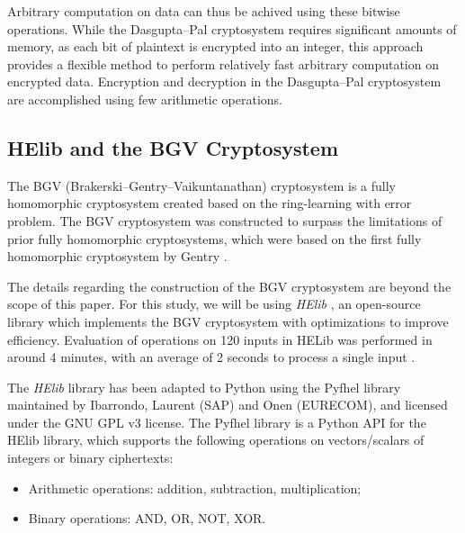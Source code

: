 Arbitrary computation on data can thus be achived using these bitwise operations. While the Dasgupta--Pal cryptosystem requires significant amounts of memory, as each bit of plaintext is encrypted into an integer, this approach provides a flexible method to perform relatively fast arbitrary computation on encrypted data. Encryption and decryption in the Dasgupta--Pal cryptosystem are accomplished using few arithmetic operations.

\subsection{HElib and the BGV Cryptosystem}
The BGV (Brakerski--Gentry--Vaikuntanathan) cryptosystem \cite{cryptoeprint:2011:277} is a fully homomorphic cryptosystem created based on the ring-learning with error problem. The BGV cryptosystem was constructed to surpass the limitations of prior fully homomorphic cryptosystems, which were based on the first fully homomorphic cryptosystem by Gentry \cite{gentry_fully_2009}.

The details regarding the construction of the BGV cryptosystem are beyond the scope of this paper. For this study, we will be using \textit{HElib} \cite{garay_algorithms_2014}, an open-source library which implements the BGV cryptosystem with optimizations to improve efficiency. Evaluation of operations on 120 inputs in HELib was performed in around 4 minutes, with an average of 2 seconds to process a single input \cite{hutchison_fully_2010,cryptoeprint:2011:566}.

The \textit{HElib} library has been adapted to Python using the Pyfhel library \cite{pyfhel_2018} maintained by Ibarrondo, Laurent (SAP) and Onen (EURECOM), and licensed under the GNU GPL v3 license. The Pyfhel library is a Python API for the HElib library, which supports the following operations on vectors/scalars of integers or binary ciphertexts:
\begin{itemize}
	\item Arithmetic operations: addition, subtraction, multiplication;
	\item Binary operations: AND, OR, NOT, XOR.
\end{itemize}
